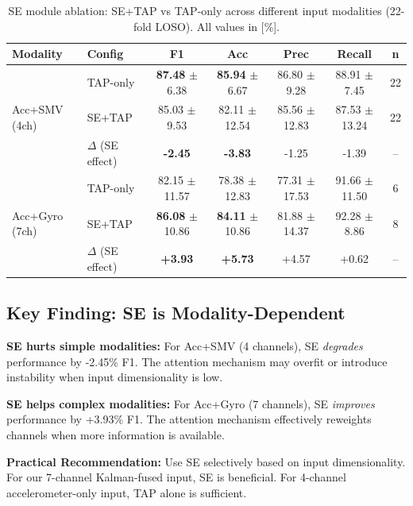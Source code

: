 \documentclass{article}
\begin{document}
\begin{table}[htbp]
    \centering
    \caption{SE module ablation: SE+TAP vs TAP-only across different input modalities (22-fold LOSO). All values in [\%].}
    \label{tab:se_ablation_modality}
    \begin{tabular}{llccccc}
        \toprule
        \textbf{Modality} & \textbf{Config} & \textbf{F1} & \textbf{Acc} & \textbf{Prec} & \textbf{Recall} & \textbf{n} \\
        \midrule
        \multirow{3}{*}{Acc+SMV (4ch)}
        & TAP-only & \textbf{87.48} $\pm$ 6.38 & \textbf{85.94} $\pm$ 6.67 & 86.80 $\pm$ 9.28 & 88.91 $\pm$ 7.45 & 22 \\
        & SE+TAP & 85.03 $\pm$ 9.53 & 82.11 $\pm$ 12.54 & 85.56 $\pm$ 12.83 & 87.53 $\pm$ 13.24 & 22 \\
        & $\Delta$ (SE effect) & \textbf{-2.45} & \textbf{-3.83} & -1.25 & -1.39 & -- \\
        \midrule
        \multirow{3}{*}{Acc+Gyro (7ch)}
        & TAP-only & 82.15 $\pm$ 11.57 & 78.38 $\pm$ 12.83 & 77.31 $\pm$ 17.53 & 91.66 $\pm$ 11.50 & 6 \\
        & SE+TAP & \textbf{86.08} $\pm$ 10.86 & \textbf{84.11} $\pm$ 10.86 & 81.88 $\pm$ 14.37 & 92.28 $\pm$ 8.86 & 8 \\
        & $\Delta$ (SE effect) & \textbf{+3.93} & \textbf{+5.73} & +4.57 & +0.62 & -- \\
        \bottomrule
    \end{tabular}
\end{table}

\subsection{Key Finding: SE is Modality-Dependent}

\begin{tcolorbox}[colback=orange!5,colframe=orange!50!black,title=\textbf{Critical Finding: SE Module Effect Depends on Input Complexity}]
\textbf{SE hurts simple modalities:} For Acc+SMV (4 channels), SE \textit{degrades} performance by -2.45\% F1. The attention mechanism may overfit or introduce instability when input dimensionality is low.

\textbf{SE helps complex modalities:} For Acc+Gyro (7 channels), SE \textit{improves} performance by +3.93\% F1. The attention mechanism effectively reweights channels when more information is available.

\textbf{Practical Recommendation:} Use SE selectively based on input dimensionality. For our 7-channel Kalman-fused input, SE is beneficial. For 4-channel accelerometer-only input, TAP alone is sufficient.
\end{tcolorbox}
\end{document}
